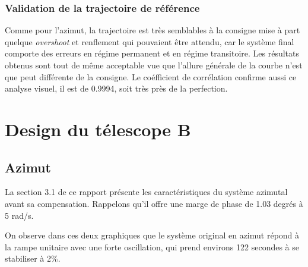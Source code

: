\documentclass{udes_rapport} %
\begin{document}
\subsubsection{Validation de la trajectoire de référence}
Comme pour l'azimut, la trajectoire est très semblables à la consigne mise à part quelque \textit{overshoot} et renflement qui pouvaient être attendu, car  le système final comporte des erreurs en régime permanent et en régime transitoire. Les résultats obtenus sont tout de même acceptable vue que l'allure générale de la courbe n'est que peut différente de la consigne. Le coéfficient de corrélation confirme aussi ce analyse visuel, il est de 0.9994, soit très près de la perfection.
\section{Design du télescope B}
\subsection{Azimut}
La section 3.1 de ce rapport présente les caractéristiques du système azimutal avant sa compensation. Rappelons qu'il offre une marge de phase de 1.03 degrés à 5 rad/s. 

\noindent\begin{minipage}{\textwidth}
\begin{minipage}{0.5\textwidth}
\end{minipage} 
\begin{minipage}{0.5\textwidth}
\end{minipage}%

\end{minipage}
On observe dans ces deux graphiques que le système original en azimut répond à la rampe unitaire avec une forte oscillation, qui prend environs 122 secondes à se stabiliser à 2\%.
\end{document}
